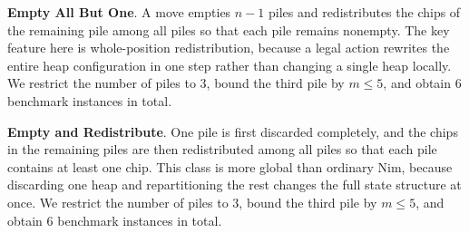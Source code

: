 \documentclass[review]{elsarticle}
\newcommand{\set}[1]{\{ #1 \}}
\newcommand{\tuple}[1]{\langle {#1} \rangle}
\newcommand{\true}{\top}
\newcommand{\statevar}{\mathcal{X}}
\newcommand{\act}{\mathcal{A}}
\newcommand{\constraint}{\mathcal{C}}
\newcommand{\estate}{\mathcal{E}}
\newcommand{\pre}{\mathtt{pre}}
\newcommand{\eff}{\mathtt{eff}}
\begin{document}
\textbf{Empty All But One}. A move empties $n-1$ piles and redistributes the chips of the remaining pile among all piles so that each pile remains nonempty.
The key feature here is whole-position redistribution, because a legal action rewrites the entire heap configuration in one step rather than changing a single heap locally.
We restrict the number of piles to $3$, bound the third pile by $m \le 5$, and obtain $6$ benchmark instances in total.

\textbf{Empty and Redistribute}. One pile is first discarded completely, and the chips in the remaining piles are then redistributed among all piles so that each pile contains at least one chip.
This class is more global than ordinary Nim, because discarding one heap and repartitioning the rest changes the full state structure at once.
We restrict the number of piles to $3$, bound the third pile by $m \le 5$, and obtain $6$ benchmark instances in total.
\end{document}
